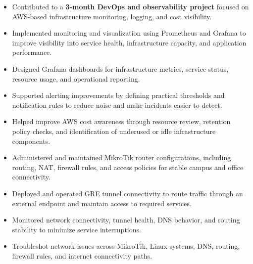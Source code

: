 \documentclass[../main.tex]{subfiles}
\begin{document}
\begin{category}
    \begin{itemize}
        \item Contributed to a \textbf{3-month DevOps and observability project} focused on AWS-based infrastructure monitoring, logging, and cost visibility.
        \item Implemented monitoring and visualization using Prometheus and Grafana to improve visibility into service health, infrastructure capacity, and application performance.
        \item Designed Grafana dashboards for infrastructure metrics, service status, resource usage, and operational reporting.
        \item Supported alerting improvements by defining practical thresholds and notification rules to reduce noise and make incidents easier to detect.
        \item Helped improve AWS cost awareness through resource review, retention policy checks, and identification of underused or idle infrastructure components.
    \end{itemize}

    \begin{itemize}
        \item Administered and maintained MikroTik router configurations, including routing, NAT, firewall rules, and access policies for stable campus and office connectivity.
        \item Deployed and operated GRE tunnel connectivity to route traffic through an external endpoint and maintain access to required services.
        \item Monitored network connectivity, tunnel health, DNS behavior, and routing stability to minimize service interruptions.
        \item Troubleshot network issues across MikroTik, Linux systems, DNS, routing, firewall rules, and internet connectivity paths.
    \end{itemize}

\end{category}
\end{document}
